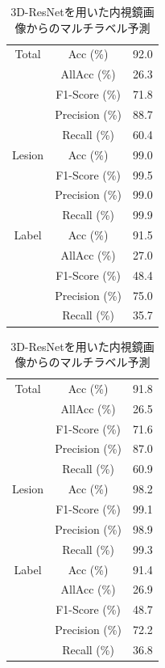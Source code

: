 \begin{table}[tb]
    \caption[]{3D-ResNetを用いた内視鏡画像からのマルチラベル予測}
    \label{tb:resnet3d_m}
    \centering
    \normalsize
    \begin{tabular}{c|c|r} \hline
        Total & Acc (\%) & 92.0 \\ \cline{2-3}
         & AllAcc (\%) & 26.3 \\ \cline{2-3}
         & F1-Score (\%) & 71.8 \\ \cline{2-3}
         & Precision (\%) & 88.7 \\ \cline{2-3}
         & Recall (\%) & 60.4 \\ \hline
        Lesion & Acc (\%) & 99.0 \\ \cline{2-3}
         & F1-Score (\%) & 99.5 \\ \cline{2-3}
         & Precision (\%) & 99.0 \\ \cline{2-3}
         & Recall (\%) & 99.9 \\ \hline
        Label & Acc (\%) & 91.5 \\ \cline{2-3}
         & AllAcc (\%) & 27.0 \\ \cline{2-3}
         & F1-Score (\%) & 48.4 \\ \cline{2-3}
         & Precision (\%) & 75.0 \\ \cline{2-3}
         & Recall (\%) & 35.7 \\ \hline
    \end{tabular}
\end{table}

\begin{table}[tb]
    \caption[]{3D-ResNetを用いた内視鏡画像からのマルチラベル予測}
    \label{tb:resnet3d_e_m}
    \centering
    \normalsize
    \begin{tabular}{c|c|r} \hline
        Total & Acc (\%) & 91.8 \\ \cline{2-3}
         & AllAcc (\%) & 26.5 \\ \cline{2-3}
         & F1-Score (\%) & 71.6 \\ \cline{2-3}
         & Precision (\%) & 87.0 \\ \cline{2-3}
         & Recall (\%) & 60.9 \\ \hline
        Lesion & Acc (\%) & 98.2 \\ \cline{2-3}
         & F1-Score (\%) & 99.1 \\ \cline{2-3}
         & Precision (\%) & 98.9 \\ \cline{2-3}
         & Recall (\%) & 99.3 \\ \hline
        Label & Acc (\%) & 91.4 \\ \cline{2-3}
         & AllAcc (\%) & 26.9 \\ \cline{2-3}
         & F1-Score (\%) & 48.7 \\ \cline{2-3}
         & Precision (\%) & 72.2 \\ \cline{2-3}
         & Recall (\%) & 36.8 \\ \hline
    \end{tabular}
\end{table}
